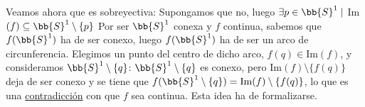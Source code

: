 \documentclass[12pt]{article}
\newcounter{ejercicio}[section] %
\newcounter{ejercicio}
\begin{document}
\begin{ejercicio}[2.5 puntos]
\begin{enumerate}
                \noindent
                Veamos ahora que es sobreyectiva:\newline
                Supongamos que no, luego $\exists p \in \bb{S}^1 \mid$ Im$(f) \subseteq \bb{S}^1 \setminus \{p\}$\newline
                Por ser $\bb{S}^1$ conexa y $f$ continua, sabemos que $f(\bb{S}^1)$ ha de ser conexo, luego $f(\bb{S}^1)$ ha de ser un arco de circunferencia.\newline
                Elegimos un punto del centro de dicho arco, $f(q) \in \mbox{Im}(f)$, y consideramos $\bb{S}^1\setminus \{q\}$:\newline
                $\bb{S}^1\setminus \{q\}$ es conexo, pero Im$(f) \setminus \{f(q)\}$ deja de ser conexo y se tiene que $f(\bb{S}^1\setminus \{q\}) = \mbox{Im}(f)\setminus \{f(q)\}$, lo que es una \underline{contradicción} con que $f$ sea continua. Esta idea ha de formalizarse. %

        \end{enumerate}
    \end{ejercicio}
\end{document}
